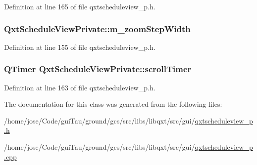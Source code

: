 Definition at line 165 of file qxtscheduleview\-\_\-p.\-h.

\hypertarget{class_qxt_schedule_view_private_a6835e926cbd90f1cb7e7a30c3cf715fc}{
\subsubsection[{m\-\_\-zoom\-Step\-Width}]{ Qxt\-Schedule\-View\-Private\-::m\-\_\-zoom\-Step\-Width}}\label{class_qxt_schedule_view_private_a6835e926cbd90f1cb7e7a30c3cf715fc}


Definition at line 155 of file qxtscheduleview\-\_\-p.\-h.

\hypertarget{class_qxt_schedule_view_private_af44460008acd0aadd209e59a9841bbc0}{
\subsubsection[{scroll\-Timer}]{\setlength{\rightskip}{0pt plus 5cm}Q\-Timer Qxt\-Schedule\-View\-Private\-::scroll\-Timer}}\label{class_qxt_schedule_view_private_af44460008acd0aadd209e59a9841bbc0}


Definition at line 163 of file qxtscheduleview\-\_\-p.\-h.



The documentation for this class was generated from the following files\-:\begin{DoxyCompactItemize}
\item 
/home/jose/\-Code/gui\-Tau/ground/gcs/src/libs/libqxt/src/gui/\hyperlink{qxtscheduleview__p_8h}{qxtscheduleview\-\_\-p.\-h}\item 
/home/jose/\-Code/gui\-Tau/ground/gcs/src/libs/libqxt/src/gui/\hyperlink{qxtscheduleview__p_8cpp}{qxtscheduleview\-\_\-p.\-cpp}\end{DoxyCompactItemize}
